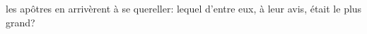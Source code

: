 \encetemps les apôtres en arrivèrent à se quereller:
	lequel d’entre eux, à leur avis, était le plus grand?
